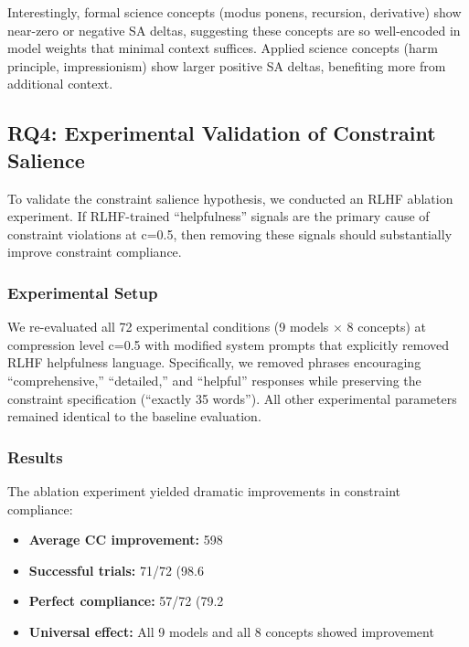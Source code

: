 \documentclass[11pt]{article}
\begin{document}
Interestingly, formal science concepts (modus ponens, recursion, derivative) show near-zero or negative SA deltas, suggesting these concepts are so well-encoded in model weights that minimal context suffices. Applied science concepts (harm principle, impressionism) show larger positive SA deltas, benefiting more from additional context.

\subsection{RQ4: Experimental Validation of Constraint Salience}

To validate the constraint salience hypothesis, we conducted an RLHF ablation experiment. If RLHF-trained ``helpfulness'' signals are the primary cause of constraint violations at c=0.5, then removing these signals should substantially improve constraint compliance.

\subsubsection{Experimental Setup}

We re-evaluated all 72 experimental conditions (9 models $\times$ 8 concepts) at compression level c=0.5 with modified system prompts that explicitly removed RLHF helpfulness language. Specifically, we removed phrases encouraging ``comprehensive,'' ``detailed,'' and ``helpful'' responses while preserving the constraint specification (``exactly 35 words''). All other experimental parameters remained identical to the baseline evaluation.

\subsubsection{Results}

The ablation experiment yielded dramatic improvements in constraint compliance:

\begin{itemize}
\item \textbf{Average CC improvement:} 598%
\item \textbf{Successful trials:} 71/72 (98.6%
\item \textbf{Perfect compliance:} 57/72 (79.2%
\item \textbf{Universal effect:} All 9 models and all 8 concepts showed improvement
\end{itemize}
\end{document}
